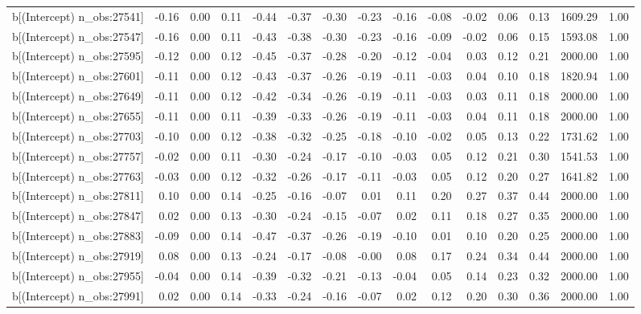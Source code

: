 \begin{table}[ht]
\begin{tabular}{rrrrrrrrrrrrrrr}
  b[(Intercept) n\_obs:27541] & -0.16 & 0.00 & 0.11 & -0.44 & -0.37 & -0.30 & -0.23 & -0.16 & -0.08 & -0.02 & 0.06 & 0.13 & 1609.29 & 1.00 \\ 
  b[(Intercept) n\_obs:27547] & -0.16 & 0.00 & 0.11 & -0.43 & -0.38 & -0.30 & -0.23 & -0.16 & -0.09 & -0.02 & 0.06 & 0.15 & 1593.08 & 1.00 \\ 
  b[(Intercept) n\_obs:27595] & -0.12 & 0.00 & 0.12 & -0.45 & -0.37 & -0.28 & -0.20 & -0.12 & -0.04 & 0.03 & 0.12 & 0.21 & 2000.00 & 1.00 \\ 
  b[(Intercept) n\_obs:27601] & -0.11 & 0.00 & 0.12 & -0.43 & -0.37 & -0.26 & -0.19 & -0.11 & -0.03 & 0.04 & 0.10 & 0.18 & 1820.94 & 1.00 \\ 
  b[(Intercept) n\_obs:27649] & -0.11 & 0.00 & 0.12 & -0.42 & -0.34 & -0.26 & -0.19 & -0.11 & -0.03 & 0.03 & 0.11 & 0.18 & 2000.00 & 1.00 \\ 
  b[(Intercept) n\_obs:27655] & -0.11 & 0.00 & 0.11 & -0.39 & -0.33 & -0.26 & -0.19 & -0.11 & -0.03 & 0.04 & 0.11 & 0.18 & 2000.00 & 1.00 \\ 
  b[(Intercept) n\_obs:27703] & -0.10 & 0.00 & 0.12 & -0.38 & -0.32 & -0.25 & -0.18 & -0.10 & -0.02 & 0.05 & 0.13 & 0.22 & 1731.62 & 1.00 \\ 
  b[(Intercept) n\_obs:27757] & -0.02 & 0.00 & 0.11 & -0.30 & -0.24 & -0.17 & -0.10 & -0.03 & 0.05 & 0.12 & 0.21 & 0.30 & 1541.53 & 1.00 \\ 
  b[(Intercept) n\_obs:27763] & -0.03 & 0.00 & 0.12 & -0.32 & -0.26 & -0.17 & -0.11 & -0.03 & 0.05 & 0.12 & 0.20 & 0.27 & 1641.82 & 1.00 \\ 
  b[(Intercept) n\_obs:27811] & 0.10 & 0.00 & 0.14 & -0.25 & -0.16 & -0.07 & 0.01 & 0.11 & 0.20 & 0.27 & 0.37 & 0.44 & 2000.00 & 1.00 \\ 
  b[(Intercept) n\_obs:27847] & 0.02 & 0.00 & 0.13 & -0.30 & -0.24 & -0.15 & -0.07 & 0.02 & 0.11 & 0.18 & 0.27 & 0.35 & 2000.00 & 1.00 \\ 
  b[(Intercept) n\_obs:27883] & -0.09 & 0.00 & 0.14 & -0.47 & -0.37 & -0.26 & -0.19 & -0.10 & 0.01 & 0.10 & 0.20 & 0.25 & 2000.00 & 1.00 \\ 
  b[(Intercept) n\_obs:27919] & 0.08 & 0.00 & 0.13 & -0.24 & -0.17 & -0.08 & -0.00 & 0.08 & 0.17 & 0.24 & 0.34 & 0.44 & 2000.00 & 1.00 \\ 
  b[(Intercept) n\_obs:27955] & -0.04 & 0.00 & 0.14 & -0.39 & -0.32 & -0.21 & -0.13 & -0.04 & 0.05 & 0.14 & 0.23 & 0.32 & 2000.00 & 1.00 \\ 
  b[(Intercept) n\_obs:27991] & 0.02 & 0.00 & 0.14 & -0.33 & -0.24 & -0.16 & -0.07 & 0.02 & 0.12 & 0.20 & 0.30 & 0.36 & 2000.00 & 1.00 \\ 

\end{tabular}
\end{table}
